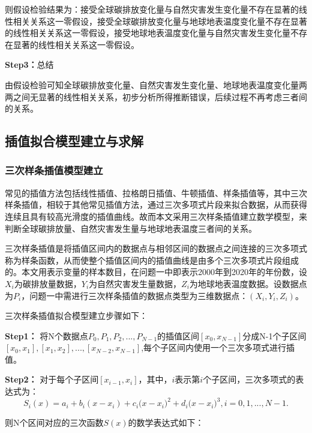 \documentclass[withoutpreface,bwprint]{cumcmthesis}
\begin{document}
	则假设检验结果为：接受全球碳排放变化量与自然灾害发生变化量不存在显著的线性相关关系这一零假设，接受全球碳排放变化量与地球地表温度变化量不存在显著的线性相关关系这一零假设，接受地球地表温度变化量与自然灾害发生变化量不存在显著的线性相关关系这一零假设。
	
	\textbf{Step3：}总结
	
	由假设检验可知全球碳排放变化量、自然灾害发生变化量、地球地表温度变化量两两之间无显著的线性相关关系，初步分析所得推断错误，后续过程不再考虑三者间的关系。
	
	\subsection{插值拟合模型建立与求解}
	\subsubsection{三次样条插值模型建立}
常见的插值方法包括线性插值、拉格朗日插值、牛顿插值、样条插值等，其中三次样条插值，相较于其他常见插值方法，通过三次多项式片段来拟合数据，从而获得连续且具有较高光滑度的插值曲线。故而本文采用三次样条插值建立数学模型，来判断全球碳排放量、自然灾害发生量与地球地表温度三者间的关系。
	    
	三次样条插值是将插值区间内的数据点与相邻区间的数据点之间连接的三次多项式称为样条函数，从而使整个插值区间内的插值曲线是由多个三次多项式片段组成的。本文用表示变量的样本数目，在问题一中即表示2000年到2020年的年份数，设$X_i$为碳排放量数据，$Y_i$为自然灾害发生量数据，$Z_i$为地球地表温度数据。设数据点为$P_i$，问题一中需进行三次样条插值的数据点类型为三维数据点：$(X_i,Y_i,Z_i)$。
	
	三次样条插值拟合模型建立步骤如下：
	
	\textbf{Step1：}
	将N个数据点${P_0},{P_1},{P_2},...,{P_{N - 1}}$的插值区间$[x_0,x_{N-1}]$分成N-1个子区间$[x_0,x_1] ,[x_1,x_2],...,[x_{N-2},x_{N-1}]$,每个子区间内使用一个三次多项式进行插值。
	
	
	
	\textbf{Step2：}
	对于每个子区间$[x_{i-1},x_i]$，其中，$i$表示第$i$个子区间，三次多项式的表达式为：
	\begin{equation}
		\label{eq:5}
		{{S}_{i}}(x)={{a}_{i}}+{{b}_{i}}(x-{{x}_{i}})+{{c}_{i}}(x-{{x}_{i}}{{)}^{2}}+{{d}_{i}}(x-{{x}_{i}}{{)}^{3}},i=0,1,...,N-1.
	\end{equation}
	
	则N个区间对应的三次函数$S(x)$的数学表达式如下：
	
\end{document}
